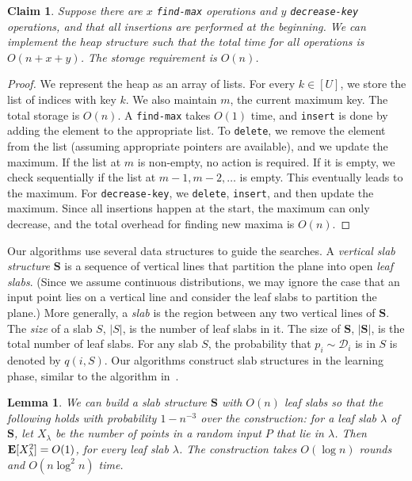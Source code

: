 \documentclass[letterpaper,11pt]{article}
\newtheorem{lemma}[theorem]{Lemma}
\newtheorem{claim}[theorem]{Claim}
\newcommand{\EX}{\hbox{\bf E}}
\newcommand{\findmax}{\texttt{find-max}}
\newcommand{\ins}{\texttt{insert}}
\newcommand{\delete}{\texttt{delete}}
\newcommand{\deckey}{\texttt{decrease-key}}
\newcommand{\bS}{\textbf{S}}
\newcommand{\cD}{\mathcal{D}}
\begin{document}
\begin{claim}\label{clm:ds} 
  Suppose there are $x$ \textup{\findmax{}} 
  operations and $y$ \textup{\deckey{}} operations,
  and that all insertions are performed at the beginning.
  We can implement the heap structure such that the total time 
  for all operations is $O(n + x + y)$. The storage requirement is
  $O(n)$.
\end{claim}

\begin{proof} 
  We represent the heap as an array 
  of lists. For every $k \in [U]$,
  we store the list of indices with key 
  $k$. We also maintain $m$, the current maximum 
  key. The total storage is $O(n)$. A \findmax{}  
  takes $O(1)$ time, and \ins{} is 
  done by adding the element to the appropriate 
  list.  To \delete{}, we remove the element from 
  the list (assuming appropriate pointers are available), 
  and we update the maximum. If the list 
  at $m$ is non-empty, no action is required. If it is empty,
  we check sequentially if the list at $m-1, m-2, \ldots$ 
  is empty.  This eventually leads to the maximum. 
  For \deckey{}, we \delete{}, \ins{}, and then 
  update the maximum.
  Since all insertions happen at the start, the maximum 
  can only decrease, and the total overhead for finding new 
  maxima is $O(n)$.
\end{proof}



Our algorithms use several data structures
to guide the searches. A \emph{vertical slab structure} $\bS$ is a 
sequence of vertical lines that
partition the plane into open \emph{leaf slabs}. 
(Since we assume continuous distributions, we 
may ignore the case that an input point lies on
a vertical line and consider the leaf slabs to 
partition the plane.)
More generally, a \emph{slab} is the 
region between any two vertical lines of $\bS$.  
The \emph{size} of a slab $S$, $|S|$, 
is the number of leaf slabs in it. 
The size of $\bS$, $|\bS|$, is the total number 
of leaf slabs.  For any slab $S$, 
the probability that $p_i \sim \cD_i$ 
is in $S$ is denoted by $q(i,S)$.
Our algorithms construct slab 
structures in the learning phase, 
similar to the algorithm 
in~\cite{AilonCCLMS11}.

\begin{lemma}\label{lem:slabstruct}
  We can build a slab structure \textup{$\bS$} 
  with $O(n)$ leaf slabs so that the following holds
  with probability $1-n^{-3}$ over the construction:
  for a leaf slab $\lambda$ of \textup{$\bS$}, 
  let $X_\lambda$  be the number of points in a 
  random input $P$ that lie in $\lambda$.  Then 
  $\EX[X^2_\lambda] = O(1)$, for every leaf slab
  $\lambda$.  The construction 
  takes $O(\log n)$ rounds and $O(n\log^2 n)$ time.
\end{lemma}
\end{document}
